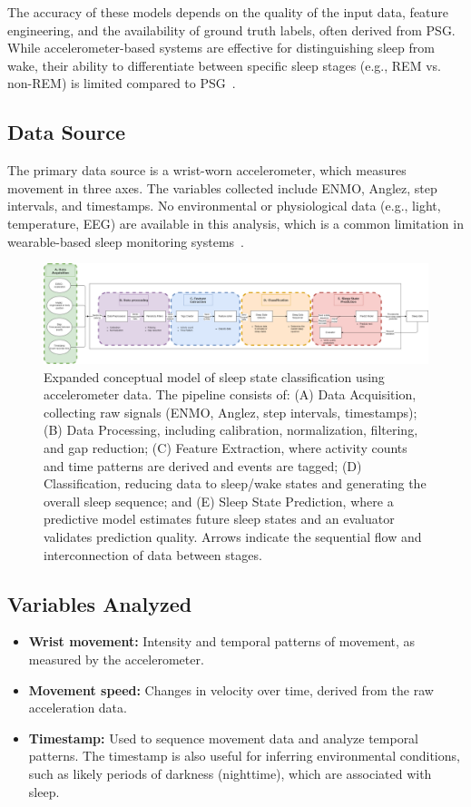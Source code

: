 \documentclass[conference]{IEEEtran}
\begin{document}
The accuracy of these models depends on the quality of the input data, feature engineering, and the availability of ground truth labels, often derived from PSG. While accelerometer-based systems are effective for distinguishing sleep from wake, their ability to differentiate between specific sleep stages (e.g., REM vs. non-REM) is limited compared to PSG~\cite{pmc4883440, researchgate2021, kushida2001, griessenberger2013}.

\subsection{Data Source}
The primary data source is a wrist-worn accelerometer, which measures movement in three axes. The variables collected include ENMO, Anglez, step intervals, and timestamps. No environmental or physiological data (e.g., light, temperature, EEG) are available in this analysis, which is a common limitation in wearable-based sleep monitoring systems~\cite{researchgate2021}.

\begin{figure}[h]
    \centering
    \includegraphics[width=\linewidth]{figures/conceptual_model.png}
    \caption{Expanded conceptual model of sleep state classification using accelerometer data. The pipeline consists of: (A) Data Acquisition, collecting raw signals (ENMO, Anglez, step intervals, timestamps); (B) Data Processing, including calibration, normalization, filtering, and gap reduction; (C) Feature Extraction, where activity counts and time patterns are derived and events are tagged; (D) Classification, reducing data to sleep/wake states and generating the overall sleep sequence; and (E) Sleep State Prediction, where a predictive model estimates future sleep states and an evaluator validates prediction quality. Arrows indicate the sequential flow and interconnection of data between stages.}
    \label{fig:conceptual_model}
\end{figure}

\subsection{Variables Analyzed}
\begin{itemize}
    \item \textbf{Wrist movement:} Intensity and temporal patterns of movement, as measured by the accelerometer.
    \item \textbf{Movement speed:} Changes in velocity over time, derived from the raw acceleration data.
    \item \textbf{Timestamp:} Used to sequence movement data and analyze temporal patterns. The timestamp is also useful for inferring environmental conditions, such as likely periods of darkness (nighttime), which are associated with sleep.
\end{itemize}
\end{document}
